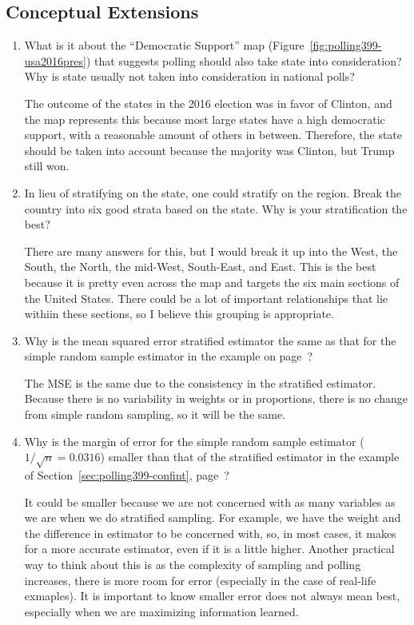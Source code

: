 \subsection*{Conceptual Extensions}
\begin{enumerate}

 \item What is it about the ``Democratic Support'' map (Figure~\ref{fig:polling399-usa2016pres}) that suggests polling should also take state into consideration? Why is state usually not taken into consideration in national polls?
\begin{solution}
The outcome of the states in the 2016 election was in favor of Clinton, and the map represents this because most large states have a high democratic support, with a reasonable amount of others in between. Therefore, the state should be taken into account because the majority was Clinton, but Trump still won. 
\end{solution}

 \item In lieu of stratifying on the state, one could stratify on the region. Break the country into six good strata based on the state. Why is your stratification the best?
\begin{solution}
There are many answers for this, but I would break it up into the West, the South, the North, the mid-West, South-East, and East. This is the best because it is pretty even across the map and targets the six main sections of the United States. There could be a lot of important relationships that lie withiin these sections, so I believe this grouping is appropriate. 
\end{solution}

 \item Why is the mean squared error stratified estimator the same as that for the simple random sample estimator in the example on page~\pageref{exp:polling399-st1}?
\begin{solution}
The MSE is the same due to the consistency in the stratified estimator. Because there is no variability in weights or in proportions, there is no change from simple random sampling, so it will be the same.
\end{solution}
 
 \item Why is the margin of error for the simple random sample estimator ($1/\sqrt{n} = 0.0316$) smaller than that of the stratified estimator in the example of Section~\ref{sec:polling399-confint}, page~\pageref{exp:polling101-confint-1}?
\begin{solution}
It could be smaller because we are not concerned with as many variables as we are when we do stratified sampling. For example, we have the weight and the difference in estimator to be concerned with, so, in most cases, it makes for a more accurate estimator, even if it is a little higher. Another practical way to think about this is as the complexity of sampling and polling increases, there is more room for error (especially in the case of real-life exmaples). It is important to know smaller error does not always mean best, especially when we are maximizing information learned.
\end{solution}


\end{enumerate}

